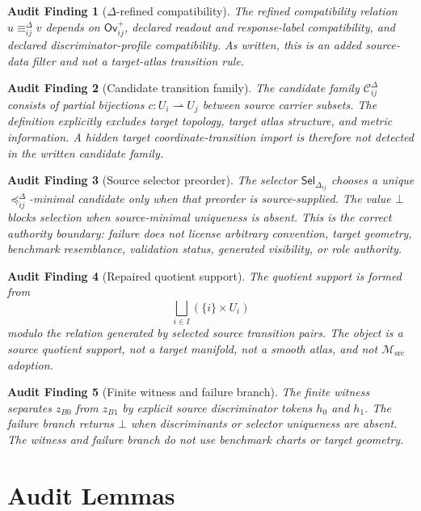 \documentclass[11pt]{article}
\newcommand{\Msrc}{\mathcal{M}_{\mathrm{src}}}
\newcommand{\Ov}{\mathsf{Ov}^{+}}
\newcommand{\Cand}{\mathcal{C}^{\Delta}}
\newcommand{\Sel}{\mathsf{Sel}_{\Delta}}
\newcommand{\Disj}{\bigsqcup}
\newtheorem{audit}{Audit Finding}
\begin{document}
\begin{audit}[\(\Delta\)-refined compatibility]
The refined compatibility relation \(u\equiv_{ij}^{\Delta}v\) depends on
\(\Ov_{ij}\), declared readout and response-label compatibility, and declared
discriminator-profile compatibility. As written, this is an added source-data
filter and not a target-atlas transition rule.
\end{audit}

\begin{audit}[Candidate transition family]
The candidate family \(\Cand_{ij}\) consists of partial bijections
\(c:U_i\rightharpoonup U_j\) between source carrier subsets. The definition
explicitly excludes target topology, target atlas structure, and metric
information. A hidden target coordinate-transition import is therefore not
detected in the written candidate family.
\end{audit}

\begin{audit}[Source selector preorder]
The selector \(\Sel_{ij}\) chooses a unique
\(\preceq_{ij}^{\Delta}\)-minimal candidate only when that preorder is
source-supplied. The value \(\bot\) blocks selection when source-minimal
uniqueness is absent. This is the correct authority boundary: failure does not
license arbitrary convention, target geometry, benchmark resemblance,
validation status, generated visibility, or role authority.
\end{audit}

\begin{audit}[Repaired quotient support]
The quotient support is formed from
\[
  \Disj_{i\in I}(\{i\}\times U_i)
\]
modulo the relation generated by selected source transition pairs. The object
is a source quotient support, not a target manifold, not a smooth atlas, and
not \(\Msrc\) adoption.
\end{audit}

\begin{audit}[Finite witness and failure branch]
The finite witness separates \(z_{B0}\) from \(z_{B1}\) by explicit source
discriminator tokens \(h_0\) and \(h_1\). The failure branch returns
\(\bot\) when discriminants or selector uniqueness are absent. The witness and
failure branch do not use benchmark charts or target geometry.
\end{audit}

\section{Audit Lemmas}
\end{document}

